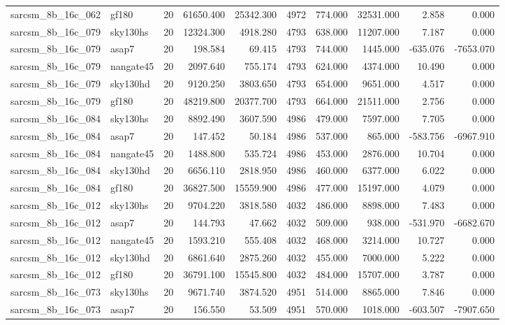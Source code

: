 \begin{longtable}{llrrrrrrrr}
sarcsm\_8b\_16c\_062 & gf180 & 20 & 61650.400 & 25342.300 & 4972 & 774.000 & 32531.000 & 2.858 & 0.000 \\
sarcsm\_8b\_16c\_079 & sky130hs & 20 & 12324.300 & 4918.280 & 4793 & 638.000 & 11207.000 & 7.187 & 0.000 \\
sarcsm\_8b\_16c\_079 & asap7 & 20 & 198.584 & 69.415 & 4793 & 744.000 & 1445.000 & -635.076 & -7653.070 \\
sarcsm\_8b\_16c\_079 & nangate45 & 20 & 2097.640 & 755.174 & 4793 & 624.000 & 4374.000 & 10.490 & 0.000 \\
sarcsm\_8b\_16c\_079 & sky130hd & 20 & 9120.250 & 3803.650 & 4793 & 654.000 & 9651.000 & 4.517 & 0.000 \\
sarcsm\_8b\_16c\_079 & gf180 & 20 & 48219.800 & 20377.700 & 4793 & 664.000 & 21511.000 & 2.756 & 0.000 \\
sarcsm\_8b\_16c\_084 & sky130hs & 20 & 8892.490 & 3607.590 & 4986 & 479.000 & 7597.000 & 7.705 & 0.000 \\
sarcsm\_8b\_16c\_084 & asap7 & 20 & 147.452 & 50.184 & 4986 & 537.000 & 865.000 & -583.756 & -6967.910 \\
sarcsm\_8b\_16c\_084 & nangate45 & 20 & 1488.800 & 535.724 & 4986 & 453.000 & 2876.000 & 10.704 & 0.000 \\
sarcsm\_8b\_16c\_084 & sky130hd & 20 & 6656.110 & 2818.950 & 4986 & 460.000 & 6377.000 & 6.022 & 0.000 \\
sarcsm\_8b\_16c\_084 & gf180 & 20 & 36827.500 & 15559.900 & 4986 & 477.000 & 15197.000 & 4.079 & 0.000 \\
sarcsm\_8b\_16c\_012 & sky130hs & 20 & 9704.220 & 3818.580 & 4032 & 486.000 & 8898.000 & 7.483 & 0.000 \\
sarcsm\_8b\_16c\_012 & asap7 & 20 & 144.793 & 47.662 & 4032 & 509.000 & 938.000 & -531.970 & -6682.670 \\
sarcsm\_8b\_16c\_012 & nangate45 & 20 & 1593.210 & 555.408 & 4032 & 468.000 & 3214.000 & 10.727 & 0.000 \\
sarcsm\_8b\_16c\_012 & sky130hd & 20 & 6861.640 & 2875.260 & 4032 & 455.000 & 7000.000 & 5.222 & 0.000 \\
sarcsm\_8b\_16c\_012 & gf180 & 20 & 36791.100 & 15545.800 & 4032 & 484.000 & 15707.000 & 3.787 & 0.000 \\
sarcsm\_8b\_16c\_073 & sky130hs & 20 & 9671.740 & 3874.520 & 4951 & 514.000 & 8865.000 & 7.846 & 0.000 \\
sarcsm\_8b\_16c\_073 & asap7 & 20 & 156.550 & 53.509 & 4951 & 570.000 & 1018.000 & -603.507 & -7907.650 \\

\end{longtable}
